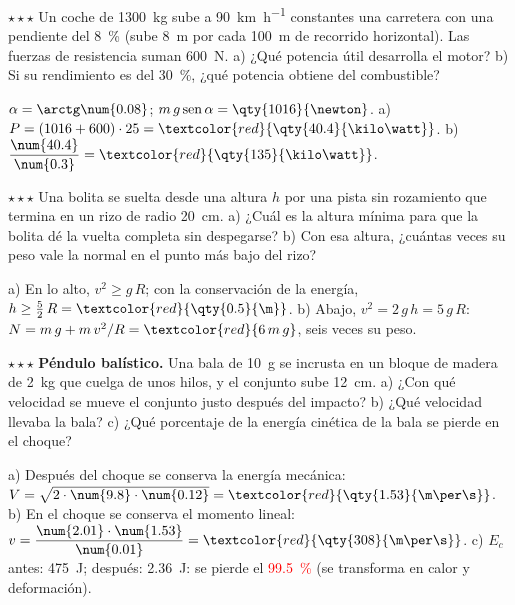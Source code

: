 \begin{exercise}
    \(\star\star\star\) Un coche de \qty{1300}{\kg} sube a \qty{90}{\km\per\hour} constantes una carretera con una pendiente del
    \qty{8}{\percent} (sube \qty{8}{\m} por cada \qty{100}{\m} de recorrido horizontal). Las fuerzas de resistencia suman
    \qty{600}{\newton}. a) ¿Qué potencia útil desarrolla el motor? b) Si su rendimiento es del \qty{30}{\percent}, ¿qué potencia obtiene
    del combustible?
    \begin{solu}
        \(\alpha = \arctg \num{0.08}\); \(m\,g\sen\alpha = \qty{1016}{\newton}\). a) \(P = (1016 + 600) \cdot 25 = \textcolor{red}{\qty{40.4}{\kilo\watt}}\).
        b) \(\dfrac{\num{40.4}}{\num{0.3}} = \textcolor{red}{\qty{135}{\kilo\watt}}\).
    \end{solu}
\end{exercise}

\begin{exercise}
    \(\star\star\star\) Una bolita se suelta desde una altura \(h\) por una pista sin rozamiento que termina en un rizo de radio
    \qty{20}{\cm}. a) ¿Cuál es la altura mínima para que la bolita dé la vuelta completa sin despegarse? b) Con esa altura, ¿cuántas veces su
    peso vale la normal en el punto más bajo del rizo?
    \begin{solu}
        a) En lo alto, \(v^2 \geq g\,R\); con la conservación de la energía, \(h \geq \frac{5}{2}\,R = \textcolor{red}{\qty{0.5}{\m}}\).
        b) Abajo, \(v^2 = 2\,g\,h = 5\,g\,R\): \(N = m\,g + m\,v^2/R = \textcolor{red}{6\,m\,g}\), seis veces su peso.
    \end{solu}
\end{exercise}

\begin{exercise}
    \(\star\star\star\) \textbf{Péndulo balístico.} Una bala de \qty{10}{\g} se incrusta en un bloque de madera de \qty{2}{\kg} que
    cuelga de unos hilos, y el conjunto sube \qty{12}{\cm}. a) ¿Con qué velocidad se mueve el conjunto justo después del impacto? b) ¿Qué
    velocidad llevaba la bala? c) ¿Qué porcentaje de la energía cinética de la bala se pierde en el choque?
    \begin{solu}
        a) Después del choque se conserva la energía mecánica: \(V = \sqrt{2 \cdot \num{9.8} \cdot \num{0.12}} = \textcolor{red}{\qty{1.53}{\m\per\s}}\).
        b) En el choque se conserva el momento lineal: \(v = \dfrac{\num{2.01} \cdot \num{1.53}}{\num{0.01}} = \textcolor{red}{\qty{308}{\m\per\s}}\).
        c) \(E_c\) antes: \qty{475}{\joule}; después: \qty{2.36}{\joule}: se pierde el \textcolor{red}{\qty{99.5}{\percent}} (se
        transforma en calor y deformación).
    \end{solu}
\end{exercise}


